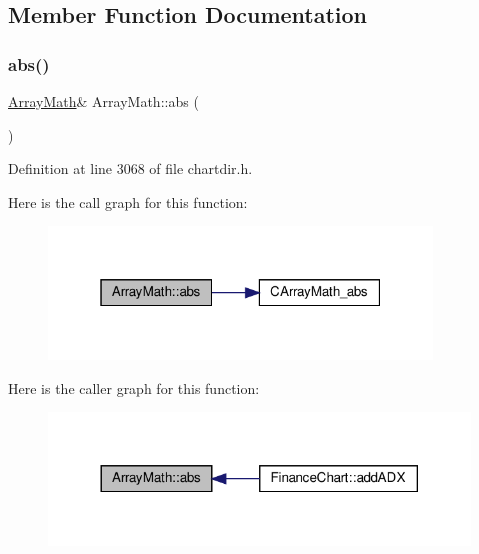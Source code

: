 \subsection{Member Function Documentation}
\mbox{\label{class_array_math_a95ff8e9bce7b34d36cde3186e3f8d886}} 
\subsubsection{\texorpdfstring{abs()}{abs()}}
{\footnotesize\ttfamily \hyperlink{class_array_math}{Array\+Math}\& Array\+Math\+::abs (\begin{DoxyParamCaption}{ }\end{DoxyParamCaption})\hspace{0.3cm}{\ttfamily [inline]}}



Definition at line 3068 of file chartdir.\+h.

Here is the call graph for this function\+:
\nopagebreak
\begin{figure}[H]
\begin{center}
\leavevmode
\includegraphics[width=289pt]{class_array_math_a95ff8e9bce7b34d36cde3186e3f8d886_cgraph}
\end{center}
\end{figure}
Here is the caller graph for this function\+:
\nopagebreak
\begin{figure}[H]
\begin{center}
\leavevmode
\includegraphics[width=317pt]{class_array_math_a95ff8e9bce7b34d36cde3186e3f8d886_icgraph}
\end{center}
\end{figure}
\mbox{\label{class_array_math_aa4a6b85dd0e0cbbd6055e5381b9f8308}} 
